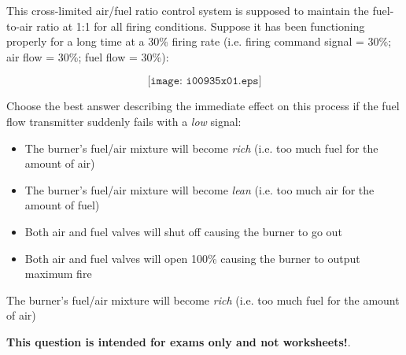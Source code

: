 

This cross-limited air/fuel ratio control system is supposed to maintain the fuel-to-air ratio at 1:1 for all firing conditions.  Suppose it has been functioning properly for a long time at a 30\% firing rate (i.e. firing command signal = 30\%; air flow = 30\%; fuel flow = 30\%):

$$\texttt{[image: i00935x01.eps]}$$

\noindent
Choose the best answer describing the immediate effect on this process if the fuel flow transmitter suddenly fails with a {\it low} signal:

\begin{itemize}
\item{} The burner's fuel/air mixture will become {\it rich} (i.e. too much fuel for the amount of air)
\vskip 10pt
\item{} The burner's fuel/air mixture will become {\it lean} (i.e. too much air for the amount of fuel)
\vskip 10pt
\item{} Both air and fuel valves will shut off causing the burner to go out
\vskip 10pt
\item{} Both air and fuel valves will open 100\% causing the burner to output maximum fire
\end{itemize}







The burner's fuel/air mixture will become {\it rich} (i.e. too much fuel for the amount of air)







{\bf This question is intended for exams only and not worksheets!}.



